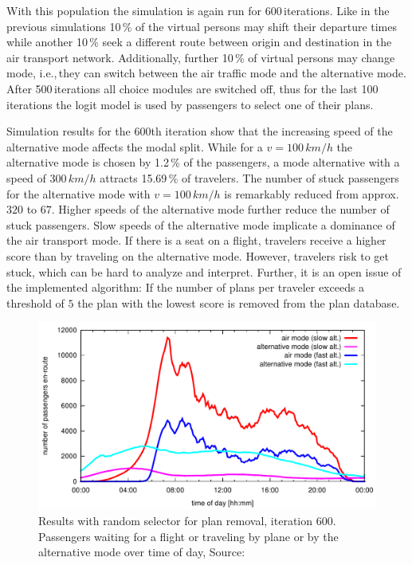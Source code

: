 With this population the simulation is again run for 600\,iterations. 
Like in the previous simulations 10\,\% of the virtual persons may shift their departure times while another 10\,\% seek a different route between origin and destination in the air transport network. 
Additionally, further 10\,\% of virtual persons may change mode, i.e.,\,they can switch between the air traffic mode and the alternative mode. 
After 500\,iterations all choice modules are switched off, thus for the last 100\,iterations the logit model is used by passengers to select one of their plans. 

Simulation results for the 600th iteration show that the 
increasing speed of the alternative mode affects the modal split. %
While for a $v = 100 \, km/h$ the alternative mode is chosen by 1.2\,\% of the passengers, a mode alternative with a speed of $300 \, km/h$ attracts 15.69\,\% of travelers. 
The number of stuck passengers for the alternative mode with $v = 100 \, km/h$ is remarkably reduced from approx.~$320$ to $67$. 
Higher speeds of the alternative mode further reduce the number of stuck passengers. 
Slow speeds of the alternative mode implicate a dominance of the air transport mode. 
If there is a seat on a flight, travelers receive a higher score than by traveling on the alternative mode. 
However, travelers risk to get stuck, which can be hard to analyze and interpret. 
Further, it is an open issue of the implemented algorithm: If the number of plans per traveler exceeds a threshold of $5$ the plan with the lowest score is removed from the plan database. 

\begin{figure}[t]
	\centering
	\includegraphics[width=\linewidth]{./extending/figures/air/leg_histogram_improved_flight_train_en_route_1893_1897_it_600.pdf}
	\caption{Results with random selector for plan removal, iteration 600. Passengers waiting for a flight or traveling by plane or by the alternative mode over time of day, Source:~\citet{Grether2014PhD}}
	\label{fig:2009_leg_histogram_modes_psl}
\end{figure}

